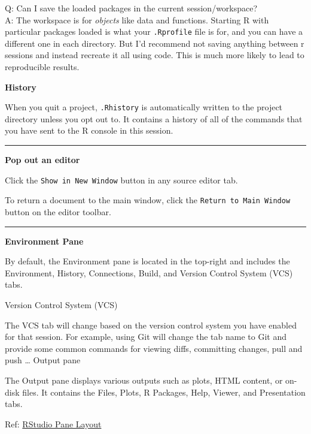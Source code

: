 \documentclass[
  a4paper,
  twoside,
  openright]{book}
\theoremstyle{definition}
\theoremstyle{definition}
\theoremstyle{definition}
\theoremstyle{definition}
\theoremstyle{remark}
\begin{document}
Q: Can I save the loaded packages in the current session/workspace?\\
A: The workspace is for \emph{objects} like data and functions. Starting R with particular packages loaded is what your \texttt{.Rprofile} file is for, and you can have a different one in each directory. But I'd recommend not saving anything between r sessions and instead recreate it all using code. This is much more likely to lead to reproducible results.

\textbf{History}

When you quit a project, \texttt{.Rhistory} is automatically written to the project directory unless you opt out to. It contains a history of all of the commands that you have sent to the R console in this session.

\begin{center}\rule{0.5\linewidth}{0.5pt}\end{center}

\textbf{Pop out an editor}

Click the \texttt{Show\ in\ New\ Window} button in any source editor tab.

To return a document to the main window, click the \texttt{Return\ to\ Main\ Window} button on the editor toolbar.

\begin{center}\rule{0.5\linewidth}{0.5pt}\end{center}

\textbf{Environment Pane}

By default, the Environment pane is located in the top-right and includes the Environment, History, Connections, Build, and Version Control System (VCS) tabs.

Version Control System (VCS)

The VCS tab will change based on the version control system you have enabled for that session. For example, using Git will change the tab name to Git and provide some common commands for viewing diffs, committing changes, pull and push \ldots{}
Output pane

The Output pane displays various outputs such as plots, HTML content, or on-disk files. It contains the Files, Plots, R Packages, Help, Viewer, and Presentation tabs.

Ref: \href{https://docs.posit.co/ide/user/ide/guide/ui/ui-panes.html\#:~:text=four\%20primary\%20panes.-,To\%20add\%20additional\%20source\%20columns\%2C\%20from\%20the\%20RStudio\%20menu\%3A\%20Global,only\%20within\%20the\%20Source\%20pane.}{RStudio Pane Layout}
\end{document}
